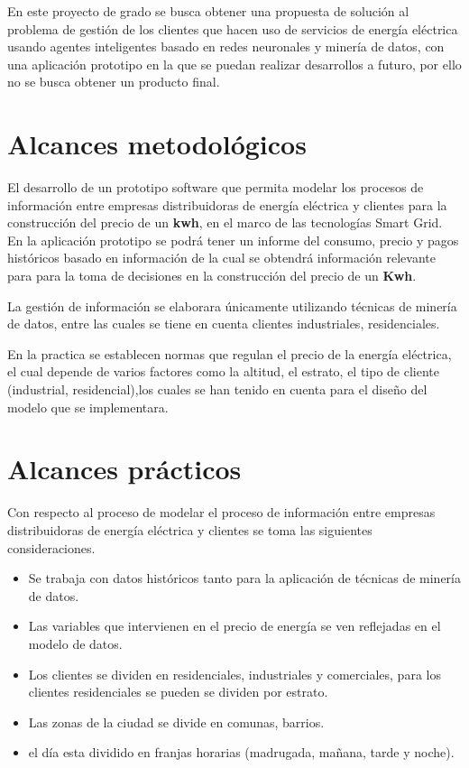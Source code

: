 En este proyecto de grado se busca obtener una propuesta de solución al problema de gestión de los clientes que hacen uso de servicios de energía eléctrica usando agentes inteligentes basado en redes neuronales y minería de datos, con una aplicación prototipo en la que se puedan realizar desarrollos a futuro, por ello no se busca obtener un producto final. 


\section{Alcances metodológicos}	
El desarrollo de un prototipo software que permita modelar los procesos de información entre empresas distribuidoras de energía eléctrica y clientes para la construcción del precio de un \textbf{kwh}, en el marco de las tecnologías Smart Grid. En la aplicación prototipo se podrá tener un informe del consumo, precio y pagos históricos basado en información de la cual se obtendrá información relevante para para la toma de decisiones en la construcción del precio de un \textbf{Kwh}.

La gestión de información se elaborara únicamente utilizando técnicas de  minería de datos, entre las cuales se tiene en cuenta clientes industriales, residenciales.

En la practica se establecen normas que regulan el precio de la energía eléctrica, el cual depende de varios factores como la altitud, el estrato, el tipo de cliente (industrial, residencial),los cuales se han tenido en cuenta para el diseño del modelo que se implementara.
 
\section{Alcances prácticos}

Con respecto al proceso de modelar el proceso de información entre empresas distribuidoras de energía eléctrica y clientes se toma las siguientes consideraciones. 

\begin{itemize}
 
\item Se trabaja con datos históricos tanto para la aplicación de técnicas de minería de datos.
\item Las variables que intervienen en el precio de energía se ven reflejadas en el modelo de datos.
\item Los clientes se dividen en residenciales, industriales y comerciales, para los clientes residenciales se pueden se dividen por estrato.
\item Las zonas de la ciudad se divide en comunas, barrios. 
\item el día esta dividido en franjas horarias (madrugada, mañana, tarde y noche).

\end{itemize}

